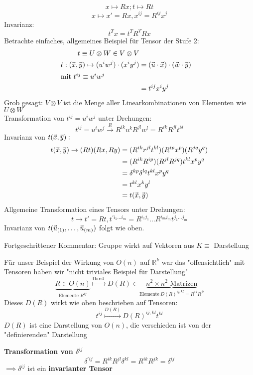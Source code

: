\documentclass[a4paper]{scrartcl}
\renewcommand{\v}[1]{\mathrlap{\vec{\mkern-2mu\phantom{#1}}}#1}
\theoremstyle{definition}
\theoremstyle{plain}
\theoremstyle{remark}
\theoremstyle{remark}
\begin{document}
\[x\mapsto Rx; t\mapsto Rt\]
\[x\mapsto x' = Rx, x^{ij} = R^{ij} x^j\]
Invarianz:
\[t^{T} x = t^{T} R^{T} R x\]
Betrachte einfaches, allgemeines Beispiel für Tensor der Stufe 2:
\begin{align*}
t\equiv U\otimes W \in V\otimes V \\
t:(\v x, \v y) \mapsto (u^i w^j) \cdot (x^i y^j) &= (\v u \cdot \v x) \cdot (\v w \cdot \v y) \\
\intertext{mit $t^{ij} \equiv u^i w^j$}
&= t^{ij} x^i y^j \\
\end{align*}
Grob gesagt: $V \otimes V$ ist die Menge aller Linearkombinationen von Elementen wie $U\otimes W$ \\
   Transformation von $t^{ij} = u^i w^j$ unter Drehungen:
\[t^{ij} = u^i w^j \xrightarrow{R} R^{ik} u^k R^{jl} w^l = R^{ik} R^{jl} t^{kl}\]
Invarianz von $t(\v x, \v y):$
\begin{align*}
t(\v x, \v y) \to (R t) (R x, R y) &= (R^{ik} r^{jl} t^{kl}) (R^{ip} x^p) (R^{jq} y^q) \\
&= (R^{ik} R^{ip}) (R^{jl} R^{jq}) t^{kl} x^p y^q \\
&= \delta^{kp} \delta^{lq} t^{kl} x^p y^q \\
&= t^{kl} x^{k} y^{l} \\
&= t(\v x, \v y)
\end{align*}
Allgemeine Transformation eines Tensors unter Drehungen:
\[t \to t' = Rt, t^{\prime i_1 \ldots i_m} = R^{i_1 j_1} \ldots R^{i_m j_m} t^{j_1 \ldots j_m}\]
Invarianz von $t(\v u_{(1)}, \ldots, \v u_{(m)})$ folgt wie oben.

Fortgeschrittener Kommentar: Gruppe wirkt auf Vektoren aus $K \equiv$ Darstellung

Für unser Beispiel der Wirkung von $O(n)$ auf $\mathbb{R}^k$ war das "offensichtlich" mit Tensoren haben wir "nicht triviales Beispiel für Darstellung"
\[\underbrace{R\in O(n)}_{\text{Elemente $R^{ij}$}} \overset{\text{Darst.}}{\mapsto} D(R) \in \underbrace{n^2 \times n^2 \text{-Matrizen}}_{\text{Elemente}~D(R)^{ij,kl} = R^{ik}R^{jl}}\]
Dieses $D(R)$ wirkt wie oben beschrieben auf Tensoren:
\[t^{ij} \overset{D(R)}{\mapsto} D(R)^{ij,kl} t^{kl}\]
$D(R)$ ist eine Darstellung von $O(n)$, die verschieden ist von der "definierenden" Darstellung

\textbf{Transformation von $\delta^{ij}$} \\
   \[\delta^{\prime ij} = R^{ik} R^{jl} \delta^{kl} = R^{ik} R^{jk} = \delta^{ij}\]
$\implies \delta^{ij}$ ist ein \textbf{invarianter Tensor} \\
\end{document}

